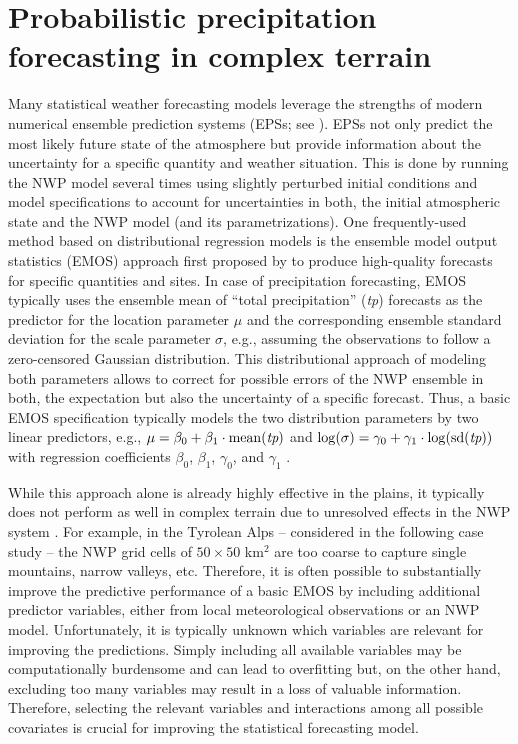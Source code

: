 \documentclass[aoas, preprint]{imsart}
\numberwithin{equation}{subsection}
\begin{document}
\section{Probabilistic precipitation forecasting in complex terrain}
\label{sec:precipitation}

Many statistical weather forecasting models leverage the strengths of modern
numerical ensemble prediction systems (EPSs; see \citealp{Bauer+Thorpe+Brunet:2015}).
EPSs not only predict the most likely future state of the atmosphere but provide
information about the uncertainty for a specific quantity and weather situation.
This is done by running the NWP model several times using slightly perturbed 
initial conditions and model specifications to account for uncertainties in both,
the initial atmospheric state and the NWP model (and its parametrizations).
One frequently-used method based on distributional regression models is the 
ensemble model output statistics (EMOS) approach first proposed by
\cite{Gneiting+Raftery+Westveld:2005} to produce high-quality forecasts for
specific quantities and sites.  
In case of precipitation forecasting, EMOS typically uses the ensemble mean of 
``total precipitation'' (\emph{tp}) forecasts as the predictor for the location 
parameter $\mu$ and the corresponding ensemble standard deviation for the 
scale parameter $\sigma$, e.g., assuming the observations to follow a zero-censored
Gaussian distribution.
This distributional approach of modeling both parameters allows to correct 
for possible errors of the NWP ensemble in both, the expectation but also the 
uncertainty of a specific forecast. Thus, a basic EMOS specification typically
models the two distribution parameters by two linear predictors, e.g., 
$\mu = \beta_0 + \beta_1 \cdot \mathrm{mean}(\emph{tp})$ and  
$\log(\sigma) = \gamma_0 + \gamma_1 \cdot \log(\mathrm{sd}(\emph{tp}))$
with regression coefficients $\beta_0$, $\beta_1$, $\gamma_0$, and $\gamma_1$
\citep[where the log link assures positivity of the scale parameter, following][]{Gebetsberger+Messner+Mayr:2017}.


While this approach alone is already highly effective in the plains,
it typically does not perform as well in complex terrain due to unresolved
effects in the NWP system \citep{Bauer+Thorpe+Brunet:2015}. 
For example, in the Tyrolean Alps -- considered
in the following case study -- the NWP grid cells of $50 \times 50$
km$^2$ are too coarse to capture single mountains, narrow valleys, etc. 
Therefore, it is often possible to substantially improve the predictive 
performance of a basic EMOS by including additional predictor variables, either 
from local meteorological observations or an NWP model. Unfortunately, it is 
typically unknown which variables are relevant for improving the predictions. 
Simply including all available variables may be computationally burdensome and
can lead to overfitting but, on the other hand, excluding too many variables
may result in a loss of valuable information. Therefore, selecting
the relevant variables and interactions among all possible covariates is 
crucial for improving the statistical forecasting model.
\end{document}
